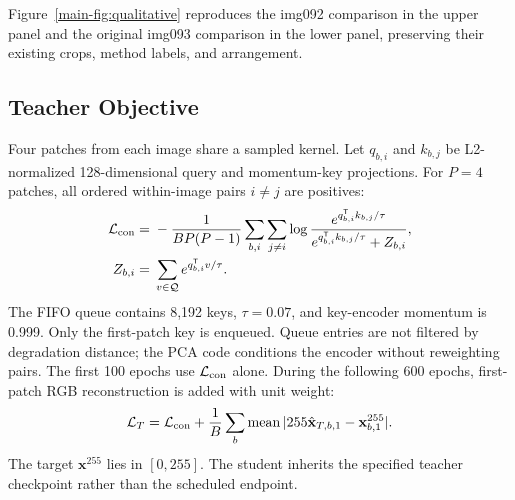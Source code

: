 \documentclass[10pt,journal,letterpaper]{IEEEtran}
\begin{document}
Figure~\ref{main-fig:qualitative} reproduces the img092 comparison in the upper panel and the original img093 comparison in the lower panel, preserving their existing crops, method labels, and arrangement.

\subsection{Teacher Objective}
Four patches from each image share a sampled kernel. Let $q_{b,i}$ and $k_{b,j}$ be L2-normalized 128-dimensional query and momentum-key projections. For $P=4$ patches, all ordered within-image pairs $i\ne j$ are positives:
\begin{equation}
\begin{split}
\mathcal L_{\rm con}={}&-\frac{1}{BP(P-1)}\sum_{b,i}\sum_{j\ne i}
\log\frac{e^{q_{b,i}^{\mathsf T}k_{b,j}/\tau}}
{e^{q_{b,i}^{\mathsf T}k_{b,j}/\tau}+Z_{b,i}},\\
Z_{b,i}={}&\sum_{v\in\mathcal Q}e^{q_{b,i}^{\mathsf T}v/\tau}.
\end{split}
\label{eq:supp_con}
\end{equation}
The FIFO queue contains 8,192 keys, $\tau=0.07$, and key-encoder momentum is 0.999. Only the first-patch key is enqueued. Queue entries are not filtered by degradation distance; the PCA code conditions the encoder without reweighting pairs. The first 100 epochs use $\mathcal L_{\rm con}$ alone. During the following 600 epochs, first-patch RGB reconstruction is added with unit weight:
\begin{equation}
\mathcal L_T=\mathcal L_{\rm con}+\frac1B\sum_b
\operatorname{mean}|255\hat{\mathbf x}_{T,b,1}-\mathbf x^{255}_{b,1}|.
\label{eq:supp_teacher}
\end{equation}
The target $\mathbf x^{255}$ lies in $[0,255]$. The student inherits the specified teacher checkpoint rather than the scheduled endpoint.
\end{document}

